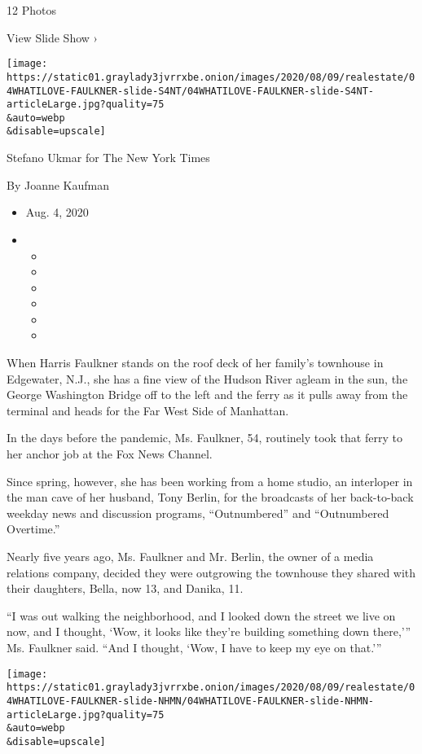 12 Photos

View Slide Show ›

\texttt{[image: https://static01.graylady3jvrrxbe.onion/images/2020/08/09/realestate/04WHATILOVE-FAULKNER-slide-S4NT/04WHATILOVE-FAULKNER-slide-S4NT-articleLarge.jpg?quality=75\\\&auto=webp\\\&disable=upscale]}

Stefano Ukmar for The New York Times

By Joanne Kaufman

\begin{itemize}
\item
  Aug. 4, 2020
\item
  \begin{itemize}
  \item
  \item
  \item
  \item
  \item
  \item
  \end{itemize}
\end{itemize}

When Harris Faulkner stands on the roof deck of her family's townhouse
in Edgewater, N.J., she has a fine view of the Hudson River agleam in
the sun, the George Washington Bridge off to the left and the ferry as
it pulls away from the terminal and heads for the Far West Side of
Manhattan.

In the days before the pandemic, Ms. Faulkner, 54, routinely took that
ferry to her anchor job at the Fox News Channel.

Since spring, however, she has been working from a home studio, an
interloper in the man cave of her husband, Tony Berlin, for the
broadcasts of her back-to-back weekday news and discussion programs,
``Outnumbered'' and ``Outnumbered Overtime.''

Nearly five years ago, Ms. Faulkner and Mr. Berlin, the owner of a media
relations company, decided they were outgrowing the townhouse they
shared with their daughters, Bella, now 13, and Danika, 11.

``I was out walking the neighborhood, and I looked down the street we
live on now, and I thought, `Wow, it looks like they're building
something down there,''' Ms. Faulkner said. ``And I thought, `Wow, I
have to keep my eye on that.'''

\texttt{[image: https://static01.graylady3jvrrxbe.onion/images/2020/08/09/realestate/04WHATILOVE-FAULKNER-slide-NHMN/04WHATILOVE-FAULKNER-slide-NHMN-articleLarge.jpg?quality=75\\\&auto=webp\\\&disable=upscale]}

